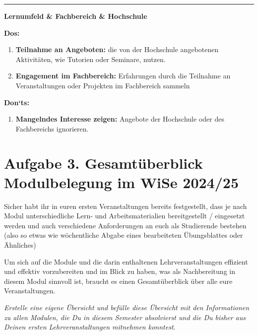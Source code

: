 \documentclass[10pt, oneside]{article}
\begin{document}
\vspace{2pt}
\hrule
\vspace{5pt}

\bgroup
\large\textbf{Lernumfeld \& Fachbereich \& Hochschule}
\egroup

\begin{multicols}{2}

\textbf{Dos:}

\begin{enumerate}[-]
    \item \textbf{Teilnahme an Angeboten:} die von der Hochschule angebotenen
        Aktivitäten, wie Tutorien oder Seminare, nutzen.
    \item \textbf{Engagement im Fachbereich:} Erfahrungen durch die Teilnahme
        an Veranstaltungen oder Projekten im Fachbereich sammeln
\end{enumerate}

\columnbreak

\textbf{Don`ts:}

\begin{enumerate}[-]
    \item \textbf{Mangelndes Interesse zeigen:} Angebote der Hochschule oder
        des Fachbereichs ignorieren.
\end{enumerate}

\end{multicols}

\pagebreak
\section{Aufgabe 3. Gesamtüberblick Modulbelegung im WiSe 2024/25}

Sicher habt ihr in euren ersten Veranstaltungen bereits festgestellt, dass je
nach Modul unterschiedliche Lern- und Arbeitsmaterialien bereitgestellt /
eingesetzt werden und auch verschiedene Anforderungen an euch als Studierende
bestehen (also so etwas wie wöchentliche Abgabe eines bearbeiteten
Übungsblattes oder Ähnliches)

Um sich auf die Module und die darin enthaltenen Lehrveranstaltungen effizient
und effektiv vorzubereiten und im Blick zu haben, was als Nachbereitung in
diesem Modul sinnvoll ist, braucht es einen Gesamtüberblick über alle eure
Veranstaltungen.

\textit{Erstelle eine eigene Übersicht und befülle diese Übersicht mit den
Informationen zu allen Modulen, die Du in diesem Semester absolvierst und die
Du bisher aus Deinen ersten Lehrveranstaltungen mitnehmen konntest}.
\end{document}
